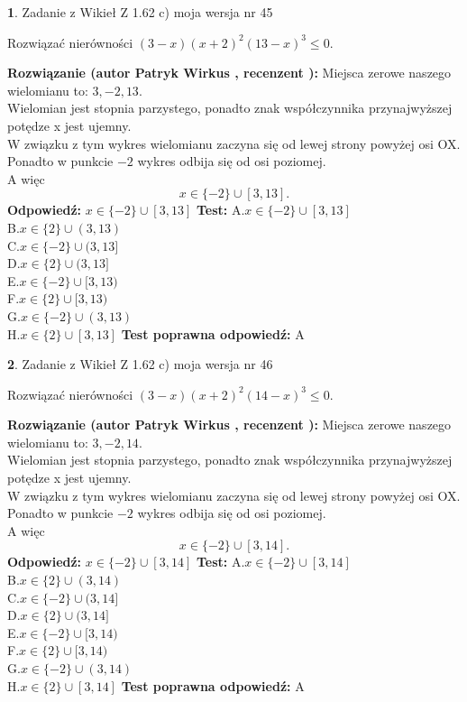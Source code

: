 \documentclass[12pt, a4paper]{article}
\theoremstyle{definition} %
\newtheorem{zad}{}
\newcommand{\zadStart}[1]{\begin{zad}#1\newline}
\newcommand{\zadStop}{\end{zad}}
\newcommand{\rozwStart}[2]{\noindent \textbf{Rozwiązanie (autor #1 , recenzent #2): }\newline}
\newcommand{\rozwStop}{\newline}
\newcommand{\odpStart}{\noindent \textbf{Odpowiedź:}\newline}
\newcommand{\odpStop}{\newline}
\newcommand{\testStart}{\noindent \textbf{Test:}\newline}
\newcommand{\testStop}{\newline}
\newcommand{\kluczStart}{\noindent \textbf{Test poprawna odpowiedź:}\newline}
\newcommand{\kluczStop}{\newline}
\begin{document}
\zadStart{Zadanie z Wikieł Z 1.62 c) moja wersja nr 45}

Rozwiązać nierówności $(3-x)(x+2)^{2}(13-x)^{3}\le0$.
\zadStop
\rozwStart{Patryk Wirkus}{}
Miejsca zerowe naszego wielomianu to: $3, -2, 13$.\\
Wielomian jest stopnia parzystego, ponadto znak współczynnika przy\linebreak najwyższej potędze x jest ujemny.\\ W związku z tym wykres wielomianu zaczyna się od lewej strony powyżej osi OX.\\
Ponadto w punkcie $-2$ wykres odbija się od osi poziomej.\\
A więc $$x \in \{-2\} \cup [3,13].$$
\rozwStop
\odpStart
$x \in \{-2\} \cup [3,13]$
\odpStop
\testStart
A.$x \in \{-2\} \cup [3,13]$\\
B.$x \in \{2\} \cup (3,13)$\\
C.$x \in \{-2\} \cup (3,13]$\\
D.$x \in \{2\} \cup (3,13]$\\
E.$x \in \{-2\} \cup [3,13)$\\
F.$x \in \{2\} \cup [3,13)$\\
G.$x \in \{-2\} \cup (3,13)$\\
H.$x \in \{2\} \cup [3,13]$
\testStop
\kluczStart
A
\kluczStop



\zadStart{Zadanie z Wikieł Z 1.62 c) moja wersja nr 46}

Rozwiązać nierówności $(3-x)(x+2)^{2}(14-x)^{3}\le0$.
\zadStop
\rozwStart{Patryk Wirkus}{}
Miejsca zerowe naszego wielomianu to: $3, -2, 14$.\\
Wielomian jest stopnia parzystego, ponadto znak współczynnika przy\linebreak najwyższej potędze x jest ujemny.\\ W związku z tym wykres wielomianu zaczyna się od lewej strony powyżej osi OX.\\
Ponadto w punkcie $-2$ wykres odbija się od osi poziomej.\\
A więc $$x \in \{-2\} \cup [3,14].$$
\rozwStop
\odpStart
$x \in \{-2\} \cup [3,14]$
\odpStop
\testStart
A.$x \in \{-2\} \cup [3,14]$\\
B.$x \in \{2\} \cup (3,14)$\\
C.$x \in \{-2\} \cup (3,14]$\\
D.$x \in \{2\} \cup (3,14]$\\
E.$x \in \{-2\} \cup [3,14)$\\
F.$x \in \{2\} \cup [3,14)$\\
G.$x \in \{-2\} \cup (3,14)$\\
H.$x \in \{2\} \cup [3,14]$
\testStop
\kluczStart
A
\kluczStop
\end{document}
